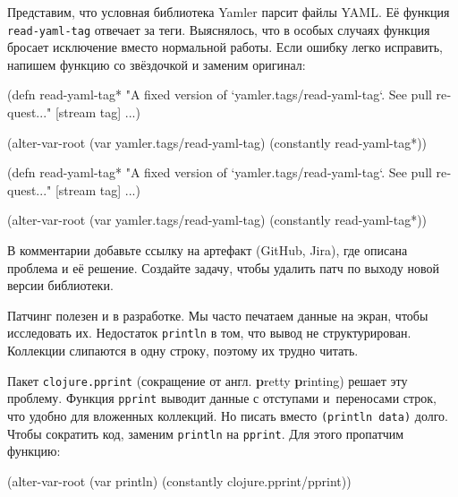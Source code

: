 Представим, что условная библиотека Yamler парсит файлы YAML. Её функция
\verb|read-yaml-tag| отвечает за теги. Выяснялось, что в особых случаях функция
бросает исключение вместо нормальной работы. Если ошибку легко исправить,
напишем функцию со звёздочкой и заменим оригинал:

\pagebreakafive

\ifnarrow

\begin{english}
  \begin{clojure}
(defn read-yaml-tag*
  "A fixed version of
   `yamler.tags/read-yaml-tag`.
   See pull request..."
  [stream tag]
  ...)

(alter-var-root
 (var yamler.tags/read-yaml-tag)
 (constantly read-yaml-tag*))
  \end{clojure}
\end{english}

\else

\begin{english}
  \begin{clojure}
(defn read-yaml-tag*
  "A fixed version of `yamler.tags/read-yaml-tag`.
   See pull request..."
  [stream tag]
  ...)

(alter-var-root
 (var yamler.tags/read-yaml-tag)
 (constantly read-yaml-tag*))
  \end{clojure}
\end{english}

\fi

В комментарии добавьте ссылку на артефакт (GitHub, Jira), где описана проблема и
её решение. Создайте задачу, чтобы удалить патч по выходу новой версии
библиотеки.

Патчинг полезен и в разработке. Мы часто печатаем данные на экран, чтобы
исследовать их. Недостаток \verb|println| в том, что вывод не
структурирован. Коллекции слипаются в одну строку, поэтому их трудно читать.


Пакет \verb|clojure.pprint| (сокращение от англ. \textbf{p}retty \textbf{p}rinting)
решает эту проблему. Функция \verb|pprint| выводит данные с отступами и~переносами строк,
что удобно для вложенных коллекций. Но писать 
вместо \verb|(println data)| долго. Чтобы сократить код, заменим \verb|println|
на \verb|pprint|. Для этого пропатчим функцию:

\begin{english}
  \begin{clojure}
(alter-var-root
 (var println)
 (constantly clojure.pprint/pprint))
  \end{clojure}
\end{english}

